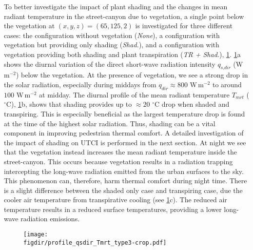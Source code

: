 To better investigate the impact of plant shading and the changes in mean radiant temperature in the street-canyon due to vegetation, a single point below the vegetation at $(x,y,z) = (65, 125, 2)$ is investigated for three different cases: the configuration without vegetation (\textit{None}), a configuration with vegetation but providing only shading (\textit{Shad.}), and a configuration with vegetation providing both shading and plant transpiration (\textit{TR + Shad.}), \cref{fig:profile_qsdir_Tmrt}. \cref{fig:profile_qsdir_Tmrt}a shows the diurnal variation of the direct short-wave radiation intensity $q_{\textit{s,dir}}$ (W\,m$^{-2}$) below the vegetation. At the presence of vegetation, we see a strong drop in the solar radiation, especially during middays from $q_{dir} \approx 800$ W\,m$^{-2}$ to around $100$ W\,m$^{-2}$ at midday. The diurnal profile of the mean radiant temperature $T_{\textit{mrt}}$ ($^{\circ}$C), \cref{fig:profile_qsdir_Tmrt}b, shows that shading provides up to $\approx 20$ $^{\circ}$C drop when shaded and transpiring. This is especially beneficial as the largest temperature drop is found at the time of the highest solar radiation. Thus, shading can be a vital component in improving pedestrian thermal comfort. A detailed investigation of the impact of shading on UTCI is performed in the next section. At night we see that the vegetation instead increases the mean radiant temperature inside the street-canyon. This occurs because vegetation results in a radiation trapping intercepting the long-wave radiation emitted from the urban surfaces to the sky. This phenomenon can, therefore, harm thermal comfort during night time. There is a slight difference between the shaded only case and transpiring case, due the cooler air temperature from transpirative cooling (see \cref{fig:profile_qsdir_Tmrt}c). The reduced air temperature results in a reduced surface temperatures, providing a lower long-wave radiation emissions.

\begin{figure}[p]
	\centering
	\texttt{[image: \\figdir/profile\_qsdir\_Tmrt\_type3-crop.pdf]}
	\caption{}
	\label{fig:profile_qsdir_Tmrt}
\end{figure}

